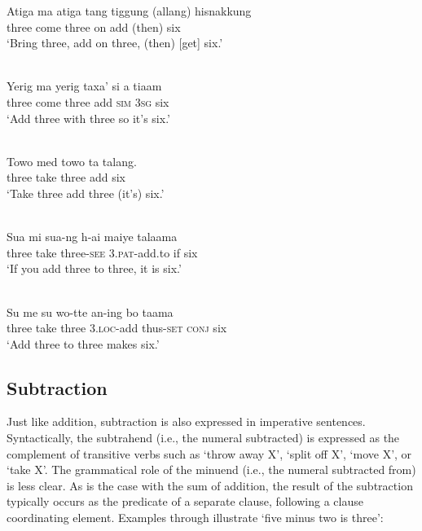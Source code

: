 \gll Atiga  ma{\footnotemark}  atiga  tang  tiggung  (allang)  hisnakkung\\  
   three   come  three  on  add  (then)  six \\
\glt  `Bring three, add on three, (then) [get] six.'
\z
{}


\ea
\label{ex:8:1237}
 
\\
 \gll Yerig  ma  yerig  taxa'   si  a  tiaam\\
   three  come  three  add  \textsc{sim  3sg } six \\
 \glt`Add three with three so it's six.'
\z


 

  


\ea
\label{ex:8:1238}
\\ 
 \gll Towo  med  towo  ta  talang.\\
    three   take   three   add   six\\
 \glt `Take three add three (it's) six.'
\z

\ea
\label{ex:8:1239}
\\
 \gll Sua  mi  sua-ng  h-ai  maiye  talaama\\
  three  take  three-\textsc{see}  \textsc{3.pat}{}-add.to  if  six \\
 \glt  `If you add three to three, it is six.'  
\z




\ea%
\label{bkm:Ref342663723}
\\
\gll   Su  me  su  wo-tte  an-ing  bo  taama\\  
   three   take  three  3.\textsc{loc}{}-add  thus-\textsc{set}   \textsc{conj}  six  \\
\glt `Add three to three makes six.'  
\z



 

  

\subsection{Subtraction}
\label{sec:8:Subtraction}
Just like addition, subtraction is also expressed in imperative sentences. Syntactically, the subtrahend (i.e., the numeral subtracted) is expressed as the complement of transitive verbs such as `throw away X', `split off X', `move X', or `take X'. The grammatical role of the minuend (i.e., the numeral subtracted from) is less clear. As is the case with the sum of addition, the result of the subtraction typically occurs as the predicate of a separate clause, following a clause coordinating element. Examples  through  illustrate `five minus two is three':


